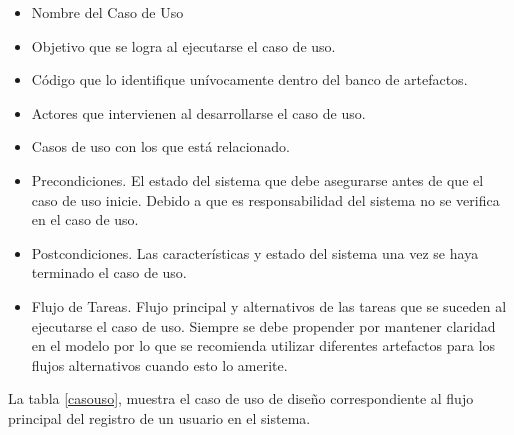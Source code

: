 \begin{itemize}
\item Nombre del Caso de Uso
\item Objetivo que se logra al ejecutarse el caso de uso.
\item Código que lo identifique unívocamente dentro del banco de artefactos.
\item Actores que intervienen al desarrollarse el caso de uso.
\item Casos de uso con los que está relacionado.
\item Precondiciones.  El estado del sistema que debe asegurarse antes de que el caso de uso inicie. Debido a que es responsabilidad del sistema no se verifica en el caso de uso.
\item Postcondiciones. Las características y estado del sistema una vez se haya terminado el caso de uso.
\item Flujo de Tareas. Flujo principal y alternativos de las tareas que se suceden al ejecutarse el caso de uso. Siempre se debe propender por mantener claridad en el modelo por lo que se recomienda utilizar diferentes artefactos para los flujos alternativos cuando esto lo amerite.
\end{itemize}

La tabla \ref{casouso}, muestra el caso de uso de diseño correspondiente al flujo principal del registro de un usuario en el sistema.

